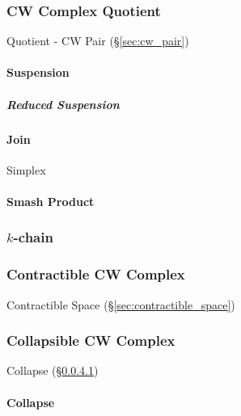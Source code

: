 \subsubsection{CW Complex Quotient}\label{sec:cwcomplex_quotient}

Quotient - CW Pair (\S\ref{sec:cw_pair})



\paragraph{Suspension}\label{sec:suspension}\hfill

\subparagraph{Reduced Suspension}\label{sec:reduced_suspension}\hfill



\paragraph{Join}\label{sec:join}\hfill

Simplex %



\paragraph{Smash Product}\label{sec:smash_product}\hfill



\subsubsection{$k$-chain}\label{sec:k_chain}




\subsubsection{Contractible CW Complex}
\label{sec:contractible_cwcomplex}

Contractible Space (\S\ref{sec:contractible_space})



\subsubsection{Collapsible CW Complex}
\label{sec:collapsible_cwcomplex}

Collapse (\S\ref{sec:collapse})



\paragraph{Collapse}\label{sec:collapse}\hfill



